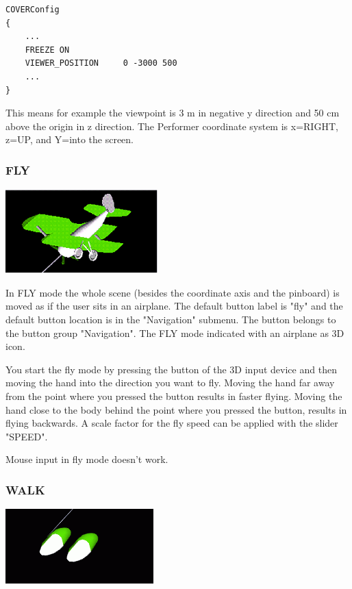 \begin{verbatim}
COVERConfig
{
    ...
    FREEZE ON
    VIEWER_POSITION 	0 -3000 500
    ...
}
\end{verbatim}
This means for example the viewpoint is 3 m in negative y direction and
50 cm above the origin in z direction. The Performer coordinate system is
x=RIGHT, z=UP, and Y=into the screen.

		
\subsubsection{FLY}
\latexonly
\includegraphics[scale=0.5]{cover/pict/fly} 
\endlatexonly
{}

In FLY mode the whole scene (besides the coordinate axis and the pinboard) 
is moved as if the user sits in an airplane. 
The default button label is "fly" and
the default button location is in the "Navigation" submenu. 
The button belongs to the button group "Navigation".
The FLY mode indicated with an airplane as 3D icon.

You start the fly mode by pressing the button of the 3D input device
and then moving the hand into the direction you want to fly.
Moving the hand far away from the point where you pressed the button 
results in faster flying. Moving the hand close to the body behind the point
where you pressed the button, results in flying backwards.
A scale factor for the fly speed can be applied with the slider "SPEED".

Mouse input in fly mode doesn't work.		
\subsubsection{WALK}
\latexonly
\includegraphics[scale=0.5]{cover/pict/walk} 
\endlatexonly
{}

